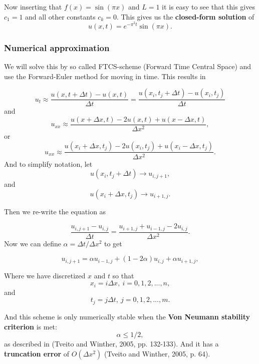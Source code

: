 Now inserting that $f(x)=\sin(\pi x)$ and $L=1$ it is easy to see that this
gives $c_1=1$ and all other constants $c_k=0$. This gives us the \textbf{closed-form
solution} of
\begin{equation*}
    u(x,t)=e^{-\pi^2 t}\sin{\left(\pi x\right)}.
\end{equation*}

\subsubsection{Numerical approximation}
We will solve this by so called FTCS-scheme (Forward Time Central Space) and
use the Forward-Euler method for moving in time. This results in

\begin{equation*}
u_t\approx \frac{u(x,t+\Delta t)-u(x,t)}{\Delta t}=\frac{u(x_i,t_j+\Delta t)-u(x_i,t_j)}{\Delta t}
\end{equation*}
and
\begin{equation*}
u_{xx}\approx \frac{u(x+\Delta x,t)-2u(x,t)+u(x-\Delta x,t)}{\Delta x^2},
\end{equation*}
or
\begin{equation*}
    u_{xx}\approx \frac{u(x_i+\Delta x,t_j)-2u(x_i,t_j)+u(x_i-\Delta x,t_j)}{\Delta x^2}.
\end{equation*}
And to simplify notation, let
\begin{equation*}
    u(x_i, t_j + \Delta t)\rightarrow u_{i,j+1},
\end{equation*}
and
\begin{equation*}
    u(x_i+\Delta x, t_j) \rightarrow u_{i+1, j}.
\end{equation*}

Then we re-write the equation as

$$
    \frac{u_{i,j+1}-u_{i,j}}{\Delta t} = \frac{u_{i+1,j}+u_{i-1,j}-2u_{i,j}}{\Delta
    x^2}.
$$
Now we can define $\alpha=\Delta t / \Delta x^2$ to get

\begin{equation}
    u_{i,j+1}=\alpha u_{i-1,j} + (1-2\alpha) u_{i,j}+\alpha u_{i+1,j},
\end{equation}

Where we have discretized $x$ and $t$ so that
$$
    x_i = i\Delta x,\ i=0,1,2,...,n,
$$
and
$$
    t_j = j\Delta t,\ j=0,1,2,...,m.
$$

And this scheme is only numerically stable when the \textbf{Von Neumann
stability criterion} is met:
$$
    \alpha\leq 1/2,
$$ 
as described in (Tveito and
Winther, 2005, pp. 132-133)\cite{1}. And it has a \textbf{truncation
error} of
$O(\Delta x^2)$ (Tveito and Winther, 2005, p. 64)\cite{1}.

